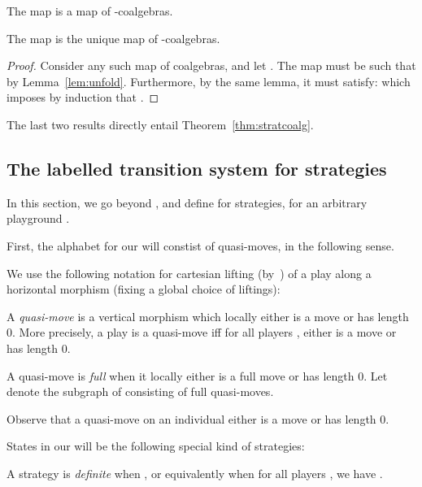 \documentclass{LMCS}
\theoremstyle{plain}\newtheorem{satz}[thm]{Satz}
\begin{document}
\begin{cor}
  The map  is a map  of -coalgebras.
\end{cor}


\begin{lem}
  The map  is the unique map  of -coalgebras.
\end{lem}
\begin{proof}
  Consider any such map  of coalgebras, and let . The map  must be such that 
   by
  Lemma~\ref{lem:unfold}.
  Furthermore, by the same lemma, it must satisfy:
   which imposes by induction that .
\end{proof}

The last two results directly entail Theorem~\ref{thm:stratcoalg}.


\subsection{The labelled transition system for strategies}\label{subsec:lts:strats}
In this section, we go beyond , and
define \anlts{} for strategies, for an arbitrary playground . 

First, the alphabet for our \lts{} will constist of quasi-moves, in the following sense.
\begin{notation}\label{not:cartesian}
  We use the following notation for cartesian lifting
  (by~) of a play  along a horizontal morphism
   (fixing a global choice of liftings):
  \begin{center}
  \end{center}
\end{notation}
\begin{defi}\label{def:quasi-move}
  A \emph{quasi-move} is a vertical morphism which locally either is a
  move or has length 0.  More precisely, a play  is
  a quasi-move iff for all players , 
  either is a move or has length 0.

  A quasi-move is \emph{full} when it locally either is a full move
  or has length 0. Let  denote the subgraph of  consisting
  of full quasi-moves.
\end{defi}
Observe that a quasi-move on an individual either is a move or has
length 0.

States in our \lts{} will be the following special kind of strategies:
\begin{defi}
  A strategy  is \emph{definite} when , or equivalently when for all players ,
  we have .
\end{defi}
\end{document}
